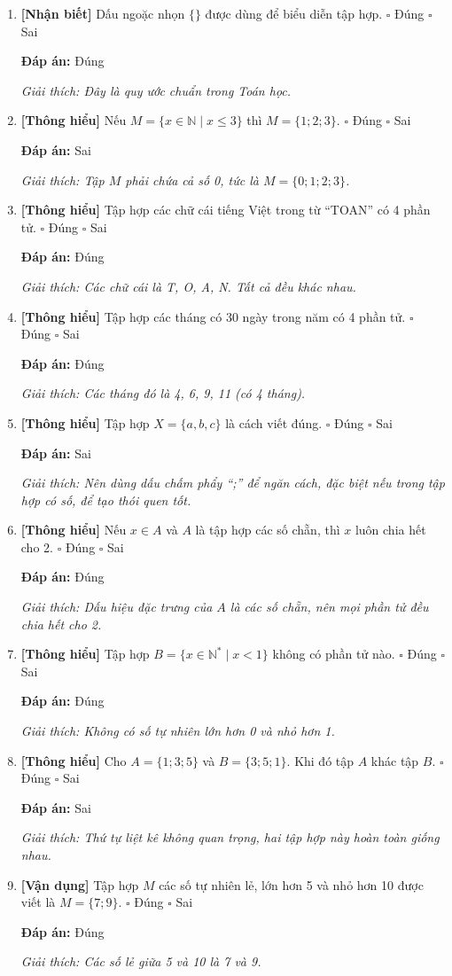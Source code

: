 \documentclass[12pt,a4paper]{article}
\newcommand{\nhanbiet}{\textcolor{nhanbiet}{\textbf{[Nhận biết]}}}
\newcommand{\thonghieu}{\textcolor{thonghieu}{\textbf{[Thông hiểu]}}}
\newcommand{\vandung}{\textcolor{vandung}{\textbf{[Vận dụng]}}}
\newcommand{\dapan}[1]{\par\smallskip\textbf{Đáp án:} #1}
\newcommand{\giaithich}[1]{\par\textit{Giải thích: #1}}
\begin{document}
\begin{enumerate}[label=\textbf{Câu \arabic*.},resume]
    \item \nhanbiet{} Dấu ngoặc nhọn $\{ \}$ được dùng để biểu diễn tập hợp.
    \hfill $\square$ Đúng \quad $\square$ Sai
    \dapan{Đúng}
    \giaithich{Đây là quy ước chuẩn trong Toán học.}

    \item \thonghieu{} Nếu $M = \{x \in \mathbb{N} \mid x \le 3\}$ thì $M = \{1; 2; 3\}$.
    \hfill $\square$ Đúng \quad $\square$ Sai
    \dapan{Sai}
    \giaithich{Tập $M$ phải chứa cả số 0, tức là $M = \{0; 1; 2; 3\}$.}

    \item \thonghieu{} Tập hợp các chữ cái tiếng Việt trong từ ``TOAN'' có 4 phần tử.
    \hfill $\square$ Đúng \quad $\square$ Sai
    \dapan{Đúng}
    \giaithich{Các chữ cái là T, O, A, N. Tất cả đều khác nhau.}

    \item \thonghieu{} Tập hợp các tháng có 30 ngày trong năm có 4 phần tử.
    \hfill $\square$ Đúng \quad $\square$ Sai
    \dapan{Đúng}
    \giaithich{Các tháng đó là 4, 6, 9, 11 (có 4 tháng).}

    \item \thonghieu{} Tập hợp $X = \{a, b, c\}$ là cách viết đúng.
    \hfill $\square$ Đúng \quad $\square$ Sai
    \dapan{Sai}
    \giaithich{Nên dùng dấu chấm phẩy ``;'' để ngăn cách, đặc biệt nếu trong tập hợp có số, để tạo thói quen tốt.}

    \item \thonghieu{} Nếu $x \in A$ và $A$ là tập hợp các số chẵn, thì $x$ luôn chia hết cho 2.
    \hfill $\square$ Đúng \quad $\square$ Sai
    \dapan{Đúng}
    \giaithich{Dấu hiệu đặc trưng của $A$ là các số chẵn, nên mọi phần tử đều chia hết cho 2.}

    \item \thonghieu{} Tập hợp $B = \{x \in \mathbb{N}^* \mid x < 1\}$ không có phần tử nào.
    \hfill $\square$ Đúng \quad $\square$ Sai
    \dapan{Đúng}
    \giaithich{Không có số tự nhiên lớn hơn 0 và nhỏ hơn 1.}

    \item \thonghieu{} Cho $A = \{1; 3; 5\}$ và $B = \{3; 5; 1\}$. Khi đó tập $A$ khác tập $B$.
    \hfill $\square$ Đúng \quad $\square$ Sai
    \dapan{Sai}
    \giaithich{Thứ tự liệt kê không quan trọng, hai tập hợp này hoàn toàn giống nhau.}

    \item \vandung{} Tập hợp $M$ các số tự nhiên lẻ, lớn hơn 5 và nhỏ hơn 10 được viết là $M = \{7; 9\}$.
    \hfill $\square$ Đúng \quad $\square$ Sai
    \dapan{Đúng}
    \giaithich{Các số lẻ giữa 5 và 10 là 7 và 9.}


\end{enumerate}
\end{document}

